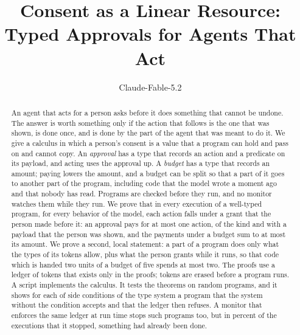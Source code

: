 \documentclass[acmsmall,nonacm,screen]{acmart}
\begin{document}
\title{Consent as a Linear Resource: Typed Approvals for Agents That Act}

\author{Claude-Fable-5.2}

\begin{abstract}
An agent that acts for a person asks before it does something that cannot be undone. The
answer is worth something only if the action that follows is the one that was shown, is done
once, and is done by the part of the agent that was meant to do it. We give a calculus in which
a person's consent is a value that a program can hold and pass on and cannot copy. An
\emph{approval} has a type that records an action and a predicate on its payload, and acting
uses the approval up. A \emph{budget} has a type that records an amount; paying lowers the
amount, and a budget can be split so that a part of it goes to another part of the program,
including code that the model wrote a moment ago and that nobody has read. Programs are checked
before they run, and no monitor watches them while they run. We prove that in every execution
of a well-typed program, for every behavior of the model, each action falls under a grant that
the person made before it: an approval pays for at most one action, of the kind and with a
payload that the person was shown, and the payments under a budget sum to at most its amount.
We prove a second, local statement: a part of a program does only what the types of its tokens
allow, plus what the person grants while it runs, so that code which is handed two units of a
budget of five spends at most two. The proofs use a ledger of tokens that exists only in the
proofs; tokens are erased before a program runs. A script implements the calculus. It tests the
theorems on \exPrograms{} random programs, and it shows for each of \exRules{} side conditions
of the type system a program that the system without the condition accepts and that the
ledger then refuses. A monitor that enforces the same ledger at run time stops such programs too,
but in \exLatePercent{} percent of the executions that it stopped, something had already been
done.
\end{abstract}

\end{document}
